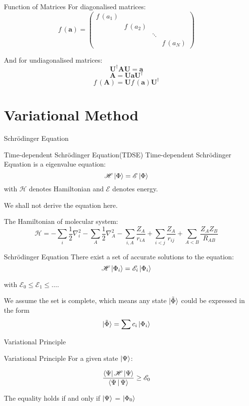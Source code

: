 \documentclass[aspectratio=169,10pt,compress,t]{ctexbeamer}
\begin{document}
\begin{frame}{Function of Matrices}
For diagonalised matrices:
$$
f\,(\mathbf{a}) =
\begin{pmatrix}
f\,(a_1) &  & & \\
 & f\,(a_2) & & \\
 & & \ddots & \\
 & & & f\,(a_N) 
\end{pmatrix}
$$

And for undiagonalised matrices:
$$\mathbf{U}^\dagger \mathbf{AU} = \mathbf{a}$$
$$\mathbf{A} = \mathbf{Ua} \mathbf{U}^\dagger$$
$$f\,(\mathbf{A}) = \mathbf{U} f\,(\mathbf{a}) \mathbf{U}^\dagger $$

\end{frame}

\section{Variational Method}

\begin{frame}{Schrödinger Equation}
\begin{block}{Time-dependent Schrödinger Equation(TDSE)}
  Time-dependent Schrödinger Equation is a eigenvalue equation:
  $$\mathscr{H} \ket{\Phi} = \mathscr{E} \ket{\Phi}$$
  with $\mathscr{H}$ denotes Hamiltonian and $\mathscr{E}$ denotes energy.
\end{block} 
We shall not derive the equation here.

The Hamiltonian of molecular system:
$$\mathscr{H} = -\sum_i \frac{1}{2} \nabla_i^2 -\sum_A \frac{1}{2} \nabla_A^2 - \sum_{i,A} \frac{Z_A}{r_{iA}} + \sum_{i<j} \frac{Z_A}{r_{ij}} + \sum_{A<B} \frac{Z_A Z_B}{R_{AB}}$$
\end{frame}

\begin{frame}{Schrödinger Equation}
There exist a set of accurate solutions to the equation:
$$\mathscr{H} \ket{\Phi_i} = \mathscr{E}_i \ket{\Phi_i}$$

with $\mathscr{E}_0 \leq \mathscr{E}_1 \leq \dots $.

\bigskip

We assume the set is complete, which means any state $\ket{\tilde{\Phi}}$ could be
expressed in the form
$$\ket{\tilde{\Phi}} = \sum c_i \ket{\Phi_i} $$
\end{frame}

\begin{frame}{Variational Principle}
\begin{block}{Variational Principle}
  For a given state $\ket{\Psi}$:

  $$\frac{\Bra{\Psi}\mathscr{H}\Ket{\Psi}}{\Braket{\Psi|\Psi}} \geq \mathscr{E}_0$$

  The equality holds if and only if $\ket{\Psi}$ = $\ket{\Phi_0}$
\end{block} 
\end{frame}
\end{document}
